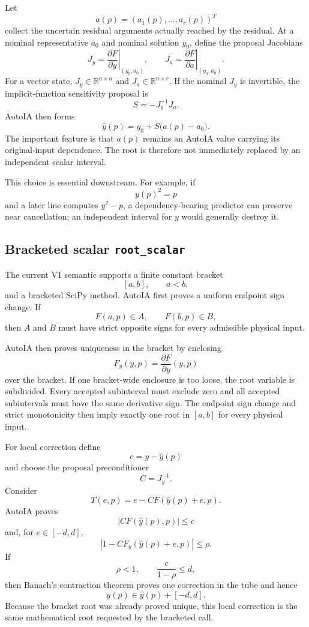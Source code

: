 \documentclass[11pt]{article}
\begin{document}
Let
\[
  a(p)=(a_1(p),\ldots,a_r(p))^T
\]
collect the uncertain residual arguments actually reached by the residual.  At a
nominal representative \(a_0\) and nominal solution \(y_0\), define the proposal
Jacobians
\[
  J_y = \left.\frac{\partial F}{\partial y}\right|_{(y_0,a_0)},
  \qquad
  J_a = \left.\frac{\partial F}{\partial a}\right|_{(y_0,a_0)}.
\]
For a vector state, \(J_y\in\mathbb{R}^{n\times n}\) and
\(J_a\in\mathbb{R}^{n\times r}\).  If the nominal \(J_y\) is invertible, the
implicit-function sensitivity proposal is
\[
  S=-J_y^{-1}J_a.
\]
AutoIA then forms
\[
  \boxed{
  \widehat y(p)=y_0+S\bigl(a(p)-a_0\bigr).
  }
\]
The important feature is that \(a(p)\) remains an AutoIA value carrying its
original-input dependence.  The root is therefore not immediately replaced by
an independent scalar interval.

This choice is essential downstream.  For example, if
\[
  y(p)^2=p
\]
and a later line computes \(y^2-p\), a dependency-bearing predictor can preserve
near cancellation; an independent interval for \(y\) would generally destroy it.

\subsection{Bracketed scalar \texttt{root\_scalar}}

The current V1 semantic supports a finite constant bracket
\[
  [a,b],\qquad a<b,
\]
and a bracketed SciPy method.  AutoIA first proves a uniform endpoint sign
change.  If
\[
  F(a,p)\in A,
  \qquad
  F(b,p)\in B,
\]
then \(A\) and \(B\) must have strict opposite signs for every admissible
physical input.

AutoIA then proves uniqueness in the bracket by enclosing
\[
  F_y(y,p)=\frac{\partial F}{\partial y}(y,p)
\]
over the bracket.  If one bracket-wide enclosure is too loose, the root variable
is subdivided.  Every accepted subinterval must exclude zero and all accepted
subintervals must have the same derivative sign.  The endpoint sign change and
strict monotonicity then imply exactly one root in \([a,b]\) for every physical
input.

For local correction define
\[
  e=y-\widehat y(p)
\]
and choose the proposal preconditioner
\[
  C=J_y^{-1}.
\]
Consider
\[
  T(e,p)=e-CF(\widehat y(p)+e,p).
\]
AutoIA proves
\[
  |CF(\widehat y(p),p)|\le c
\]
and, for \(e\in[-d,d]\),
\[
  |1-CF_y(\widehat y(p)+e,p)|\le\rho.
\]
If
\[
  \rho<1,
  \qquad
  \frac{c}{1-\rho}\le d,
\]
then Banach's contraction theorem proves one correction in the tube and hence
\[
  \boxed{y(p)\in\widehat y(p)+[-d,d].}
\]
Because the bracket root was already proved unique, this local correction is the
same mathematical root requested by the bracketed call.
\end{document}
